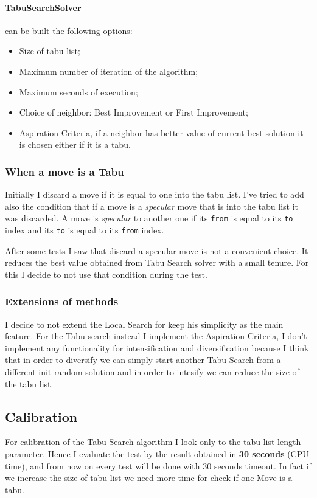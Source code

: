 	\paragraph{TabuSearchSolver} can be built the following options:
	\begin{itemize}
		\item Size of tabu list;
		\item Maximum number of iteration of the algorithm;
		\item Maximum seconds of execution;
		\item Choice of neighbor: Best Improvement or First Improvement;
		\item Aspiration Criteria, if a neighbor has better value of current best solution it is chosen either if it is a tabu.
	\end{itemize}

	\subsubsection{When a move is a Tabu}
		Initially I discard a move if it is equal to one into the tabu list.
		I've tried to add also the condition that if a move is a \textit{specular} move that is into the tabu list it was discarded. A move is \textit{specular} to another one if its \verb|from| is equal to its \verb|to| index and its \verb|to| is equal to its \verb|from| index.
		
		After some tests I saw that discard a specular move is not a convenient choice. It reduces the best value obtained from Tabu Search solver with a small tenure. For this I decide to not use that condition during the test.
		
	\subsubsection{Extensions of methods}
		I decide to not extend the Local Search for keep his simplicity as the main feature. For the Tabu search instead I implement the Aspiration Criteria, I don't implement any functionality for intensification and diversification because I think that in order to diversify we can simply start another Tabu Search from a different init random solution and in order to intesify we can reduce the size of the tabu list.
	
\subsection{Calibration}
	For calibration of the Tabu Search algorithm I look only to the tabu list length parameter. Hence I evaluate the test by the result obtained in \textbf{30 seconds} (CPU time), and from now on every test will be done with 30 seconds timeout. In fact if we increase the size of tabu list we need more time for check if one Move is a tabu.
	
